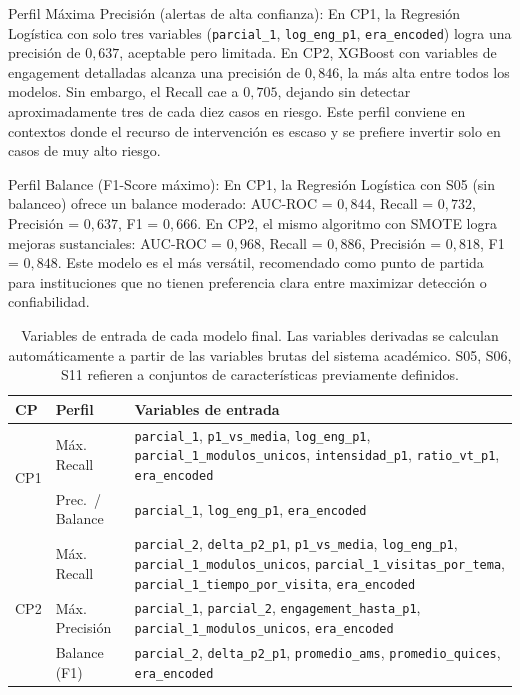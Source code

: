 \documentclass[12pt, letterpaper, openany]{report}
\begin{document}
Perfil Máxima Precisión (alertas de alta confianza): En CP1, la Regresión Logística con solo tres variables (\texttt{parcial\_1}, \texttt{log\_eng\_p1}, \texttt{era\_encoded}) logra una precisión de $0{,}637$, aceptable pero limitada. En CP2, XGBoost con variables de engagement detalladas alcanza una precisión de $0{,}846$, la más alta entre todos los modelos. Sin embargo, el Recall cae a $0{,}705$, dejando sin detectar aproximadamente tres de cada diez casos en riesgo. Este perfil conviene en contextos donde el recurso de intervención es escaso y se prefiere invertir solo en casos de muy alto riesgo.

Perfil Balance (F1-Score máximo): En CP1, la Regresión Logística con S05 (sin balanceo) ofrece un balance moderado: AUC-ROC = $0{,}844$, Recall = $0{,}732$, Precisión = $0{,}637$, F1 = $0{,}666$. En CP2, el mismo algoritmo con SMOTE logra mejoras sustanciales: AUC-ROC = $0{,}968$, Recall = $0{,}886$, Precisión = $0{,}818$, F1 = $0{,}848$. Este modelo es el más versátil, recomendado como punto de partida para instituciones que no tienen preferencia clara entre maximizar detección o confiabilidad.

\begin{table}[!htbp]
  \centering
  \caption{Variables de entrada de cada modelo final. Las variables derivadas se calculan automáticamente a partir de las variables brutas del sistema académico. S05, S06, S11 refieren a conjuntos de características previamente definidos.}
  \label{tab:modelos_features}
  \small
  \begin{tabular}{llp{9cm}}
    \toprule
    CP & Perfil & Variables de entrada \\
    \midrule
    \multirow{2}{*}{CP1}
      & Máx. Recall     & \texttt{parcial\_1}, \texttt{p1\_vs\_media}, \texttt{log\_eng\_p1}, \texttt{parcial\_1\_modulos\_unicos}, \texttt{intensidad\_p1}, \texttt{ratio\_vt\_p1}, \texttt{era\_encoded} \\[4pt]
      & Prec.\ / Balance & \texttt{parcial\_1}, \texttt{log\_eng\_p1}, \texttt{era\_encoded} \\
    \midrule
    \multirow{3}{*}{CP2}
      & Máx. Recall     & \texttt{parcial\_2}, \texttt{delta\_p2\_p1}, \texttt{p1\_vs\_media}, \texttt{log\_eng\_p1}, \texttt{parcial\_1\_modulos\_unicos}, \texttt{parcial\_1\_visitas\_por\_tema}, \texttt{parcial\_1\_tiempo\_por\_visita}, \texttt{era\_encoded} \\[4pt]
      & Máx. Precisión  & \texttt{parcial\_1}, \texttt{parcial\_2}, \texttt{engagement\_hasta\_p1}, \texttt{parcial\_1\_modulos\_unicos}, \texttt{era\_encoded} \\[4pt]
      & Balance (F1)    & \texttt{parcial\_2}, \texttt{delta\_p2\_p1}, \texttt{promedio\_ams}, \texttt{promedio\_quices}, \texttt{era\_encoded} \\
    \bottomrule
  \end{tabular}
\end{table}
\end{document}
